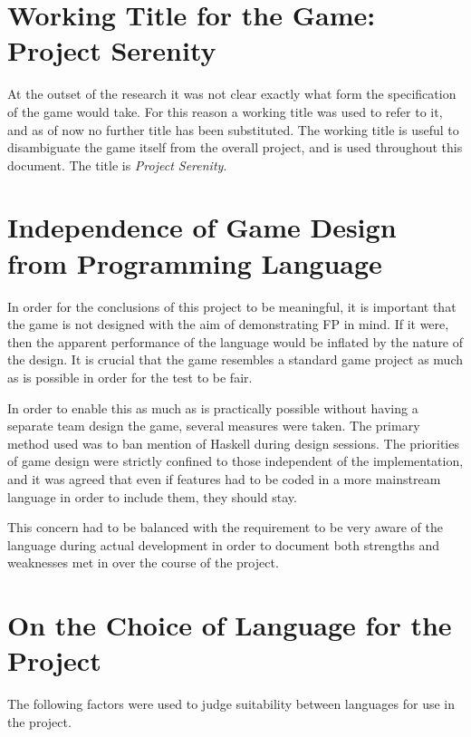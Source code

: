 \section{Working Title for the Game: Project Serenity}

At the outset of the research it was not clear exactly what form the specification of the game would take. For this reason a working title was used to refer to it, and as of now no further title has been substituted. The working title is useful to disambiguate the game itself from the overall project, and is used throughout this document. The title is \emph{Project Serenity}.

\section{Independence of Game Design from Programming Language}

In order for the conclusions of this project to be meaningful, it is important that the game is not designed with the aim of demonstrating FP in mind. If it were, then the apparent performance of the language would be inflated by the nature of the design. It is crucial that the game resembles a standard game project as much as is possible in order for the test to be fair.

In order to enable this as much as is practically possible without having a separate team design the game, several measures were taken. The primary method used was to ban mention of Haskell during design sessions. The priorities of game design were strictly confined to those independent of the implementation, and it was agreed that even if features had to be coded in a more mainstream language in order to include them, they should stay. 

This concern had to be balanced with the requirement to be very aware of the language during actual development in order to document both strengths and weaknesses met in over the course of the project.

\section{On the Choice of Language for the Project}

The following factors were used to judge suitability between languages for use in the project.

